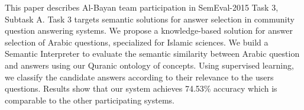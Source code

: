 This paper describes Al-Bayan team participation in SemEval-2015 Task 3, Subtask A. Task 3 targets semantic solutions for answer selection in community question answering systems. We propose a knowledge-based solution for answer selection of Arabic questions, specialized for Islamic sciences. We build a Semantic Interpreter to evaluate the semantic similarity between Arabic question and answers using our Quranic ontology of concepts. Using supervised learning, we classify the candidate answers according to their relevance to the users questions. Results show that our system achieves 74.53\% accuracy which is comparable to the other participating systems.
